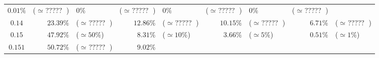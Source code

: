 \documentclass[10pt]{report}
\begin{document}
\begin{exercice}
\begin{center}
\begin{tabular}{|c|rl|rl|rl|rl|}
        $0.01\%$
         & 
    
        ($\simeq \mbox{ ????? }$)
         & 
    
        $0\%$
         & 
    
        ($\simeq \mbox{ ????? }$)
         & 
    
        $0\%$
         & 
    
        ($\simeq \mbox{ ????? }$)
         & 
    
        $0\%$
         & 
    
        ($\simeq \mbox{ ????? }$)
        
    \\ 

    
        $0.14$
         & 
    
        $23.39\%$
         & 
    
        ($\simeq \mbox{ ????? }$)
         & 
    
        $12.86\%$
         & 
    
        ($\simeq \mbox{ ????? }$)
         & 
    
        $10.15\%$
         & 
    
        ($\simeq \mbox{ ????? }$)
         & 
    
        $6.71\%$
         & 
    
        ($\simeq \mbox{ ????? }$)
        
    \\ 

    
        $0.15$
         & 
    
        $47.92\%$
         & 
    
        ($\simeq 50\%$)
         & 
    
        $8.31\%$
         & 
    
        ($\simeq 10\%$)
         & 
    
        $3.66\%$
         & 
    
        ($\simeq 5\%$)
         & 
    
        $0.51\%$
         & 
    
        ($\simeq 1\%$)
        
    \\ 

    
        $0.151$
         & 
    
        $50.72\%$
         & 
    
        ($\simeq \mbox{ ????? }$)
         & 
    
        $9.02\%$
         & 
    

\end{tabular}
\end{center}
\end{exercice}
\end{document}
